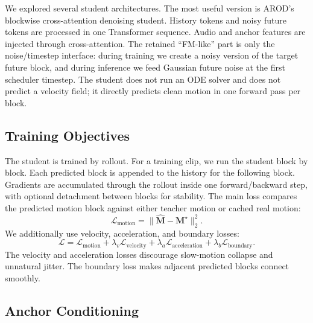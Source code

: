 \documentclass{article}
\begin{document}
We explored several student architectures. The most useful version is AROD's blockwise cross-attention denoising student. History tokens and noisy future tokens are processed in one Transformer sequence. Audio and anchor features are injected through cross-attention. The retained ``FM-like'' part is only the noise/timestep interface: during training we create a noisy version of the target future block, and during inference we feed Gaussian future noise at the first scheduler timestep. The student does not run an ODE solver and does not predict a velocity field; it directly predicts clean motion in one forward pass per block.

\subsection{Training Objectives}

The student is trained by rollout. For a training clip, we run the student block by block. Each predicted block is appended to the history for the following block. Gradients are accumulated through the rollout inside one forward/backward step, with optional detachment between blocks for stability. The main loss compares the predicted motion block against either teacher motion or cached real motion:
\begin{equation}
    \mathcal{L}_{\text{motion}} =
    \| \hat{\mathbf{M}} - \mathbf{M}^\star \|_2^2.
\end{equation}
We additionally use velocity, acceleration, and boundary losses:
\begin{equation}
    \mathcal{L}
    =
    \mathcal{L}_{\text{motion}}
    + \lambda_v \mathcal{L}_{\text{velocity}}
    + \lambda_a \mathcal{L}_{\text{acceleration}}
    + \lambda_b \mathcal{L}_{\text{boundary}}.
\end{equation}
The velocity and acceleration losses discourage slow-motion collapse and unnatural jitter. The boundary loss makes adjacent predicted blocks connect smoothly.

\subsection{Anchor Conditioning}
\end{document}
